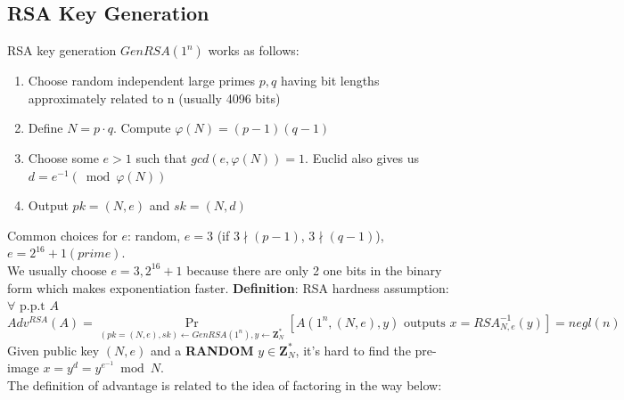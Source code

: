 \documentclass{scribe}
\begin{document}
\subsection{RSA Key Generation}
RSA key generation $GenRSA(1^n)$ works as follows:
\begin{enumerate}
    \item Choose random independent large primes $p,q$ having bit lengths approximately related to n (usually 4096 bits)
    \item Define $N = p \cdot q$. Compute $\varphi(N) = (p-1)(q-1)$
    \item Choose some $e>1$ such that $gcd(e,\varphi(N)) = 1$. Euclid also gives us $d = e^{-1} (\bmod \varphi(N))$
    \item Output $pk = (N,e)$ and $sk = (N,d)$
\end{enumerate}
Common choices for $e$: random, $e=3$ (if $3 \nmid (p-1)$, $3 \nmid (q-1)$), $e = 2^{16} +1 (prime)$. 
\\
We usually choose $e=3, 2^{16} +1$ because there are only 2 one bits in the binary form which makes exponentiation faster.
\vspace{5mm}
\textbf{Definition}: RSA hardness assumption: $\forall \text{ p.p.t } A$
\[Adv^{RSA}(A) = \Pr_{(pk=(N,e), sk) \leftarrow GenRSA(1^n), y \leftarrow \mathbf{Z}_N^*} [A(1^n, (N,e), y) \text{ outputs }x=RSA_{N,e}^{-1}(y)] = negl(n)\]
Given public key $(N,e)$ and a \textbf{RANDOM} $y \in \mathbf{Z}_N^*$, it's hard to find the pre-image $x=y^d = y^{e^{-1}} \bmod N$.
\vspace{5mm}
\\
The definition of advantage is related to the idea of factoring in the way below:
\end{document}
